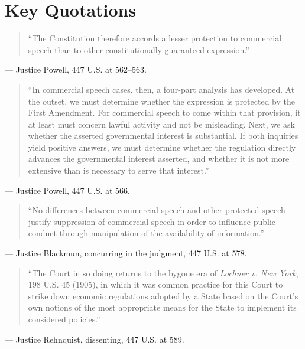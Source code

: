 \documentclass[12pt]{article}
\begin{document}
\section{Key Quotations}
\begin{quote}
``The Constitution therefore accords a lesser protection to commercial speech than to other constitutionally guaranteed expression.''
\end{quote}
\noindent --- Justice Powell, 447 U.S. at 562--563.

\begin{quote}
``In commercial speech cases, then, a four-part analysis has developed. At the outset, we must determine whether the expression is protected by the First Amendment. For commercial speech to come within that provision, it at least must concern lawful activity and not be misleading. Next, we ask whether the asserted governmental interest is substantial. If both inquiries yield positive answers, we must determine whether the regulation directly advances the governmental interest asserted, and whether it is not more extensive than is necessary to serve that interest.''
\end{quote}
\noindent --- Justice Powell, 447 U.S. at 566.

\begin{quote}
``No differences between commercial speech and other protected speech justify suppression of commercial speech in order to influence public conduct through manipulation of the availability of information.''
\end{quote}
\noindent --- Justice Blackmun, concurring in the judgment, 447 U.S. at 578.

\begin{quote}
``The Court in so doing returns to the bygone era of \textit{Lochner v. New York}, 198 U.S. 45 (1905), in which it was common practice for this Court to strike down economic regulations adopted by a State based on the Court's own notions of the most appropriate means for the State to implement its considered policies.''
\end{quote}
\noindent --- Justice Rehnquist, dissenting, 447 U.S. at 589.
\end{document}
